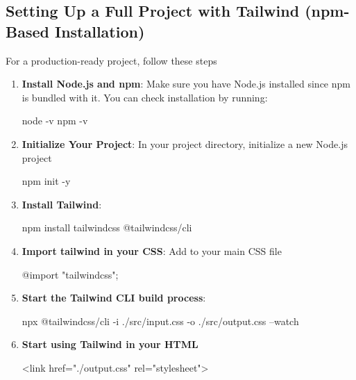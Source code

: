 \documentclass{report}
\begin{document}
    \bigbreak \noindent 
    \subsection{Setting Up a Full Project with Tailwind (npm-Based Installation)}
    \bigbreak \noindent 
    For a production-ready project, follow these steps
    \begin{enumerate}
        \item \textbf{Install Node.js and npm}: Make sure you have Node.js installed since npm is bundled with it. You can check installation by running:
            \bigbreak \noindent 
            \begin{bashcode}
            node -v
            npm -v
            \end{bashcode}
        \item \textbf{Initialize Your Project}: In your project directory, initialize a new Node.js project
            \bigbreak \noindent 
            \begin{bashcode}
            npm init -y 
            \end{bashcode}
        \item \textbf{Install Tailwind}:
            \bigbreak \noindent 
            \begin{bashcode}
            npm install tailwindcss @tailwindcss/cli
            \end{bashcode}
        \item \textbf{Import tailwind in your CSS}: Add to your main CSS file
            \bigbreak \noindent 
            \begin{cppcode}
            @import "tailwindcss";
            \end{cppcode}
        \item \textbf{Start the Tailwind CLI build process}:
            \bigbreak \noindent 
            \begin{bashcode}
            npx @tailwindcss/cli -i ./src/input.css -o ./src/output.css --watch
            \end{bashcode}
        \item \textbf{Start using Tailwind in your HTML}
            \bigbreak \noindent 
            \begin{htmlcode}
              <link href="./output.css" rel="stylesheet">
            \end{htmlcode}
    \end{enumerate}

    \bigbreak \noindent 
\end{document}
